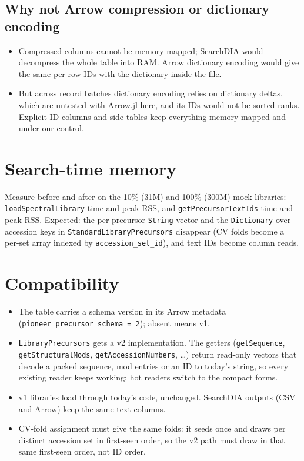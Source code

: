 \documentclass[10pt]{article}
\newcommand{\code}[1]{\texttt{#1}}
\begin{document}
\subsection*{Why not Arrow compression or dictionary encoding}
\begin{itemize}
\item Compressed columns cannot be memory-mapped;
  SearchDIA would decompress the whole table into RAM. Arrow dictionary encoding would give the same per-row IDs with
  the dictionary inside the file.
\item But across record batches dictionary encoding relies on dictionary deltas, which are untested with Arrow.jl here,
  and its IDs would not be sorted ranks. Explicit ID columns and side tables keep everything memory-mapped and under our
  control.
\end{itemize}

\section{Search-time memory}
Measure before and after on the 10\% (31M) and 100\% (300M) mock libraries: \code{loadSpectralLibrary} time and peak
RSS, and \code{getPrecursorTextIds} time and peak RSS. Expected: the per-precursor \code{String} vector and the
\code{Dictionary} over accession keys in \code{StandardLibraryPrecursors} disappear (CV folds become a per-set
array indexed by \code{accession\_set\_id}), and text IDs become column reads.

\section{Compatibility}
\begin{itemize}
\item The table carries a schema version in its Arrow metadata (\code{pioneer\_precursor\_schema = 2}); absent means v1.
\item \code{LibraryPrecursors} gets a v2 implementation. The getters (\code{getSequence}, \code{getStructuralMods},
  \code{getAccession\-Numbers}, \ldots) return read-only vectors that decode a packed sequence,
  mod entries or an ID to today's string, so every existing reader keeps working; hot readers switch to the compact
  forms.
\item v1 libraries load through today's code, unchanged. SearchDIA outputs (CSV and Arrow) keep the same text columns.
\item CV-fold assignment must give the same folds: it seeds once and draws per distinct accession set in
  first-seen order, so the v2 path must draw in that same first-seen order, not ID order.
\end{itemize}
\end{document}
